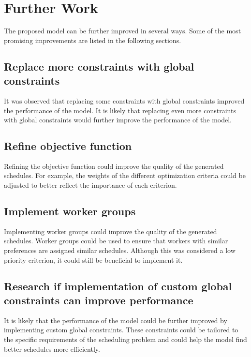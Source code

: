 \documentclass[conference]{IEEEtran}
\begin{document}
\section{Further Work}
\label{section:further-work}

The proposed model can be further improved in several ways. Some of the most promising improvements are listed in the following sections.

\subsection*{Replace more constraints with global constraints}

It was observed that replacing some constraints with global constraints improved the performance of the model. It is likely that replacing even more constraints with global constraints would further improve the performance of the model.

\subsection*{Refine objective function}

Refining the objective function could improve the quality of the generated schedules. For example, the weights of the different optimization criteria could be adjusted to better reflect the importance of each criterion.

\subsection*{Implement worker groups}

Implementing worker groups could improve the quality of the generated schedules. Worker groups could be used to ensure that workers with similar preferences are assigned similar schedules. Although this was considered a low priority criterion, it could still be beneficial to implement it.

\subsection*{Research if implementation of custom global constraints can improve performance}

It is likely that the performance of the model could be further improved by implementing custom global constraints. These constraints could be tailored to the specific requirements of the scheduling problem and could help the model find better schedules more efficiently.
\end{document}
